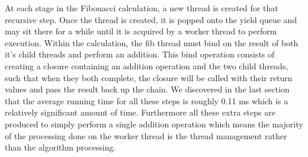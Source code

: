 \documentclass[12pt,twoside,notitlepage]{report}
\begin{document}
%
%
At each stage in the Fibonacci calculation, a new thread is created for that recursive step. Once the thread is created, it is popped onto the yield queue and may sit there for a while until it is acquired by a worker thread to
perform execution. Within the calculation, the fib thread must bind on the result of both it's child threads and perform an addition. This bind operation consists of creating a closure containing an addition operation and the two
child threads, such that when they both complete, the closure will be called with their return values and pass the result back up the chain. We discovered in the last section that the average running time for all these steps is
roughly 0.11 ms which is a relatively significant amount of time. Furthermore all these extra steps are produced to simply perform a single addition operation which means the majority of the processing done on the worker thread is the
thread management rather than the algorithm processing.

% 
\end{document}
